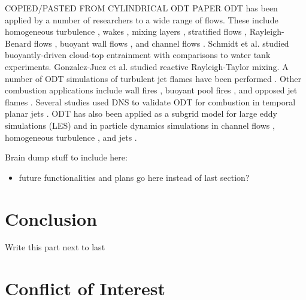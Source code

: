 \documentclass[preprint,12pt, a4paper]{elsarticle}
\begin{document}
COPIED/PASTED FROM CYLINDRICAL ODT PAPER
ODT has been applied by a number of researchers to a wide range of flows. These include homogeneous turbulence \cite{Kerstein_1999,Sun_2014}, wakes \cite{Kerstein_2000}, mixing layers \cite{Kerstein_1999,Kerstein_2001,Ashurst_2003,Ashurst_2005}, stratified flows \cite{Wunsch_2001}, Rayleigh-Benard flows \cite{Wunsch_2005}, buoyant wall flows \cite{Dreeben_2000,Shihn_2007}, and channel flows \cite{Schmidt_2009,Schmidt_2003,Lignell_2013}. Schmidt et al. \cite{Schmidt_2013} studied buoyantly-driven cloud-top entrainment with comparisons to water tank experiments. Gonzalez-Juez et al. \cite{Esteban_2013} studied reactive Rayleigh-Taylor mixing. A number of ODT simulations of turbulent jet flames have been performed \cite{Echekki_2001,Hewson_2001,Hewson_2002,Punati_2011,Lignell_2012b,Lignell_2015}. Other combustion applications include wall fires \cite{Monson_2016,Shihn_2004}, buoyant pool fires \cite{Ricks_2010,Hewson_2006,Hewson_2009}, and opposed jet flames \cite{Jozefik_2015}. Several studies used DNS to validate ODT for combustion in temporal planar jets \cite{Punati_2011,Lignell_2012b,Lignell_2015}. ODT has also been applied as a subgrid model for large eddy simulations (LES) \cite{Cao_2008,Schmidt_2003,Schmidt_2010} and in particle dynamics simulations in channel flows \cite{Schmidt_2009}, homogeneous turbulence \cite{Sun_2014}, and jets \cite{Sun_2017,Goshayeshi_2015}.

Brain dump stuff to include here:
\begin{itemize}
	\item future functionalities and plans go here instead of last section?
\end{itemize}

\section{Conclusion}
\label{sec:conclusion}

Write this part next to last

\section{Conflict of Interest}
%
\end{document}
